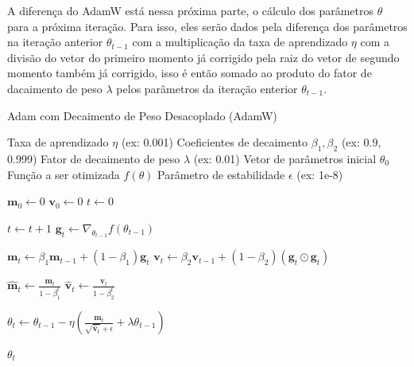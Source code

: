 A diferença do AdamW está nessa próxima parte, o cálculo dos parâmetros $\theta$ para a próxima iteração. Para isso, eles serão dados pela diferença dos parâmetros na iteração anterior $\theta_{t-1}$ com a multiplicação da taxa de aprendizado $\eta$ com a divisão do vetor do primeiro momento já corrigido pela raiz do vetor de segundo momento também já corrigido, isso é então somado ao produto do fator de dacaimento de peso $\lambda$ pelos parâmetros da iteração enterior $\theta_{t-1}$.

\begin{algorithm}[H]
    \caption{Adam com Decaimento de Peso Desacoplado (AdamW)}
    \label{alg:adamw}
    \begin{algorithmic}[1]

    \Require Taxa de aprendizado $\eta$ (ex: 0.001)
    \Require Coeficientes de decaimento $\beta_1, \beta_2$ (ex: 0.9, 0.999)
    \Require Fator de decaimento de peso $\lambda$ (ex: 0.01)
    \Require Vetor de parâmetros inicial $\theta_0$
    \Require Função a ser otimizada $f(\theta)$
    \Require Parâmetro de estabilidade $\epsilon$ (ex: 1e-8)

    \State $\mathbf{m}_0 \leftarrow 0$ 
    \State $\mathbf{v}_0 \leftarrow 0$ 
    \State $t \leftarrow 0$ 

        \State $t \leftarrow t + 1$
        \State $\mathbf{g}_t \leftarrow \nabla_{\theta_{t-1}} f(\theta_{t-1})$ 
        
        \State $\mathbf{m}_t \leftarrow \beta_1 \mathbf{m}_{t-1} + (1 - \beta_1) \mathbf{g}_t$
        \State $\mathbf{v}_t \leftarrow \beta_2 \mathbf{v}_{t-1} + (1 - \beta_2) (\mathbf{g}_t \odot \mathbf{g}_t)$
        
        \State $\mathbf{\hat{m}}_t \leftarrow \frac{\mathbf{m}_t}{1 - \beta_1^t}$
        \State $\mathbf{\hat{v}}_t \leftarrow \frac{\mathbf{v}_t}{1 - \beta_2^t}$
        
        \State $\theta_t \leftarrow \theta_{t-1} - \eta \left( \frac{\mathbf{\hat{m}}_t}{\sqrt{\mathbf{\hat{v}}_t} + \epsilon} + \lambda \theta_{t-1} \right)$
    \EndWhile

    \State \Return $\theta_t$ 
    \end{algorithmic}
\end{algorithm}

